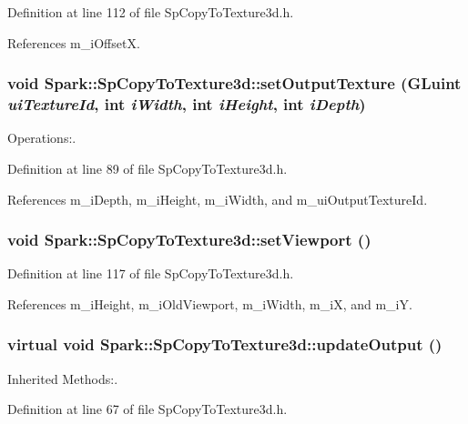 Definition at line 112 of file Sp\-Copy\-To\-Texture3d.h.

References m\_\-i\-Offset\-X.
\subsubsection{\setlength{\rightskip}{0pt plus 5cm}void Spark::Sp\-Copy\-To\-Texture3d::set\-Output\-Texture (GLuint {\em ui\-Texture\-Id}, int {\em i\-Width}, int {\em i\-Height}, int {\em i\-Depth})\hspace{0.3cm}{\tt  [inline]}}\label{classSpark_1_1SpCopyToTexture3d_a3}


Operations:. 

Definition at line 89 of file Sp\-Copy\-To\-Texture3d.h.

References m\_\-i\-Depth, m\_\-i\-Height, m\_\-i\-Width, and m\_\-ui\-Output\-Texture\-Id.
\subsubsection{\setlength{\rightskip}{0pt plus 5cm}void Spark::Sp\-Copy\-To\-Texture3d::set\-Viewport ()\hspace{0.3cm}{\tt  [inline]}}\label{classSpark_1_1SpCopyToTexture3d_a6}


Definition at line 117 of file Sp\-Copy\-To\-Texture3d.h.

References m\_\-i\-Height, m\_\-i\-Old\-Viewport, m\_\-i\-Width, m\_\-i\-X, and m\_\-i\-Y.
\subsubsection{\setlength{\rightskip}{0pt plus 5cm}virtual void Spark::Sp\-Copy\-To\-Texture3d::update\-Output ()\hspace{0.3cm}{\tt  [inline, virtual]}}\label{classSpark_1_1SpCopyToTexture3d_a2}


Inherited Methods:. 

Definition at line 67 of file Sp\-Copy\-To\-Texture3d.h.

